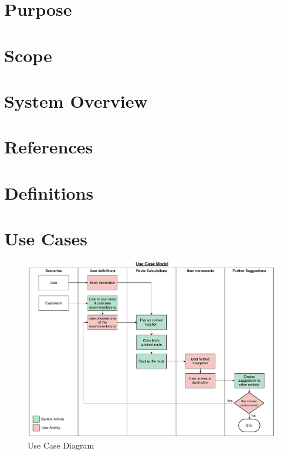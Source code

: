 
\section{Purpose}

\section{Scope}

\section{System Overview}

\section{References}

\section{Definitions}

\section{Use Cases}
\begin{figure}[H]
    \centering
    \includegraphics[width=\textwidth]
    {assets/use_case.pdf}
    \caption{Use Case Diagram}
    \label{fig:Use Case Diagram}
\end{figure}

